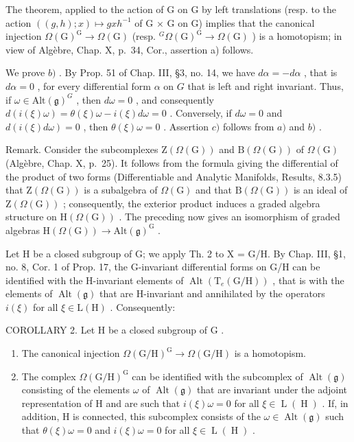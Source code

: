 The theorem, applied to the action of G on G by left translations (resp. to the action \(((g,h);x)\mapsto gxh^{-1}\) of G × G on G) implies that the canonical injection \(\Omega(\mathrm{G})^{\mathrm{G}}\to\Omega(\mathrm{G})\) (resp. \({}^{G}\Omega(\mathrm{G})^{\mathrm{G}}\to\Omega(\mathrm{G})\) ) is a homotopism; in view of Algèbre, Chap. X, p.~34, Cor., assertion a) follows.

We prove \(b)\) . By Prop. 51 of Chap. III, §3, no. 14, we have \(d\alpha = -d\alpha\) , that is \(d\alpha = 0\) , for every differential form \(\alpha\) on \(G\) that is left and right invariant. Thus, if \(\omega \in \mathrm{Alt}(\mathfrak{g})^G\) , then \(d\omega = 0\) , and consequently \(d(i(\xi)\omega) = \theta(\xi)\omega - i(\xi)d\omega = 0\) . Conversely, if \(d\omega = 0\) and \(d(i(\xi)d\omega) = 0\) , then \(\theta(\xi)\omega = 0\) . Assertion \(c)\) follows from \(a)\) and \(b)\) .

Remark. Consider the subcomplexes \(\mathrm{Z}(\varOmega(\mathrm{G}))\) and \(\mathrm{B}(\varOmega(\mathrm{G}))\) of \(\varOmega(\mathrm{G})\) (Algèbre, Chap. X, p.~25). It follows from the formula giving the differential of the product of two forms (Differentiable and Analytic Manifolds, Results, 8.3.5) that \(\mathrm{Z}(\varOmega(\mathrm{G}))\) is a subalgebra of \(\varOmega(\mathrm{G})\) and that \(\mathrm{B}(\varOmega(\mathrm{G}))\) is an ideal of \(\mathrm{Z}(\varOmega(\mathrm{G}))\) ; consequently, the exterior product induces a graded algebra structure on \(\mathrm{H}(\varOmega(\mathrm{G}))\) . The preceding now gives an isomorphism of graded algebras \(\mathrm{H}(\varOmega(\mathrm{G})) \to \mathrm{Alt}(\mathfrak{g})^{\mathrm{G}}\) .

Let H be a closed subgroup of G; we apply Th. 2 to X = G/H. By Chap. III, §1, no. 8, Cor. 1 of Prop. 17, the G-invariant differential forms on G/H can be identified with the H-invariant elements of \(\operatorname{Alt}(\mathrm{T}_{e}(\mathrm{G}/\mathrm{H}))\) , that is with the elements of \(\operatorname{Alt}(\mathfrak{g})\) that are H-invariant and annihilated by the operators \(i(\xi)\) for all \(\xi \in \mathrm{L}(\mathrm{H})\) . Consequently:

COROLLARY 2. Let \(\mathrm{H}\) be a closed subgroup of \(\mathrm{G}\) .

\begin{enumerate}
\def\labelenumi{\alph{enumi})}
\item
  The canonical injection \(\Omega (\mathrm{G / H})^{\mathrm{G}}\to \Omega (\mathrm{G / H})\) is a homotopism.
\item
  The complex \(\Omega(\mathrm{G}/\mathrm{H})^{\mathrm{G}}\) can be identified with the subcomplex of \(\operatorname{Alt}(\mathfrak{g})\) consisting of the elements \(\omega\) of \(\operatorname{Alt}(\mathfrak{g})\) that are invariant under the adjoint representation of H and are such that \(i(\xi)\omega = 0\) for all \(\xi \in \operatorname{L}(\operatorname{H})\) . If, in addition, H is connected, this subcomplex consists of the \(\omega \in \operatorname{Alt}(\mathfrak{g})\) such that \(\theta(\xi)\omega = 0\) and \(i(\xi)\omega = 0\) for all \(\xi \in \operatorname{L}(\operatorname{H})\) .
\end{enumerate}

